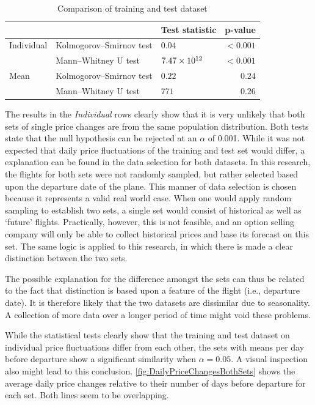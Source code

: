 \begin{table}
\centering
\begin{tabular}{l l l r}
\toprule
~  &  ~  &  Test statistic  &  p-value  \\
\midrule
Individual  &   Kolmogorov--Smirnov test  & $0.04$  &  $< 0.001$  \\
~           &   Mann--Whitney U test  &  $7.47 \times 10^{12}$ &  $< 0.001$ \\
Mean        &   Kolmogorov--Smirnov test  & $0.22$  &  $0.24$  \\
~           &   Mann--Whitney U test  &  $771$  &  $0.26$ \\
\bottomrule
\end{tabular}
\caption{Comparison of training and test dataset}
\label{tbl:ComparisionOfDatasets}
\end{table}


The results in the \emph{Individual} rows clearly show that it is very unlikely that both sets of single price changes are from the same population distribution. Both tests state that the null hypothesis can be rejected at an $\alpha$ of 0.001. While it was not expected that daily price fluctuations of the training and test set would differ, a explanation can be found in the data selection for both datasets. In this research, the flights for both sets were not randomly sampled, but rather selected based upon the departure date of the plane. This manner of data selection is chosen because it represents a valid real world case. When one would apply random sampling to establish two sets, a single set would consist of historical as well as `future' flights. Practically, however, this is not feasible, and an option selling company will only be able to collect historical prices and base its forecast on this set. The same logic is applied to this research, in which there is made a clear distinction between the two sets.

The possible explanation for the difference amongst the sets can thus be related to the fact that distinction is based upon a feature of the flight (i.e., departure date). It is therefore likely that the two datasets are dissimilar due to seasonality. A collection of more data over a longer period of time might void these problems.

While the statistical tests clearly show that the training and test dataset on individual price fluctuations differ from each other, the sets with means per day before departure show a significant similarity when $\alpha = 0.05$. A visual inspection also might lead to this conclusion. \autoref{fig:DailyPriceChangesBothSets} shows the average daily price changes relative to their number of days before departure for each set. Both lines seem to be overlapping.


